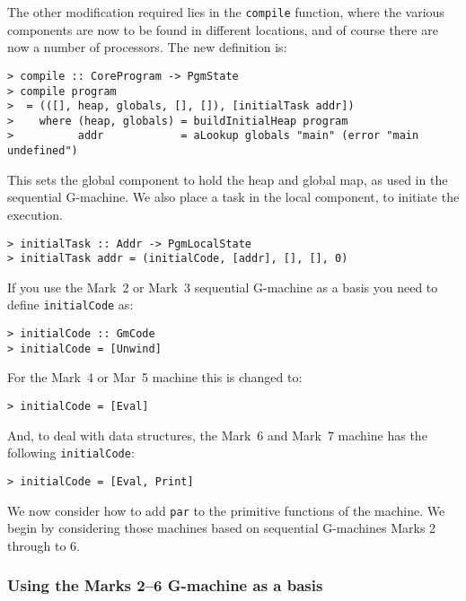 The other modification required lies in the \mbox{\tt compile} function, where
the various components are now to be found in different locations, and
of course there are now a number of processors. The new definition is:
\begin{verbatim}
> compile :: CoreProgram -> PgmState
> compile program
>  = (([], heap, globals, [], []), [initialTask addr])
>    where (heap, globals) = buildInitialHeap program
>          addr            = aLookup globals "main" (error "main undefined")
\end{verbatim}
%
%
This sets the global component to hold the heap and global map, as
used in the sequential G-machine. We also place a task in the local
component, to initiate the execution.
\begin{verbatim}
> initialTask :: Addr -> PgmLocalState
> initialTask addr = (initialCode, [addr], [], [], 0)
\end{verbatim}
%
%
\par
If you use the Mark~2 or Mark~3 sequential G-machine as a basis you need to
define \mbox{\tt initialCode} as:
\begin{verbatim}
> initialCode :: GmCode
> initialCode = [Unwind]
\end{verbatim}
%
%
For the Mark~4 or Mar~5 machine this is changed to:
\begin{verbatim}
> initialCode = [Eval]
\end{verbatim}
%
And, to deal with data structures, the Mark~6 and Mark~7 machine has the
following \mbox{\tt initialCode}:
\begin{verbatim}
> initialCode = [Eval, Print]
\end{verbatim}
%
\par
We now consider how to add \mbox{\tt par} to the primitive functions of the
machine. We begin by considering those machines based on sequential
G-machines Marks 2 through to 6.

\subsubsection{Using the Marks 2--6 G-machine as a basis}

